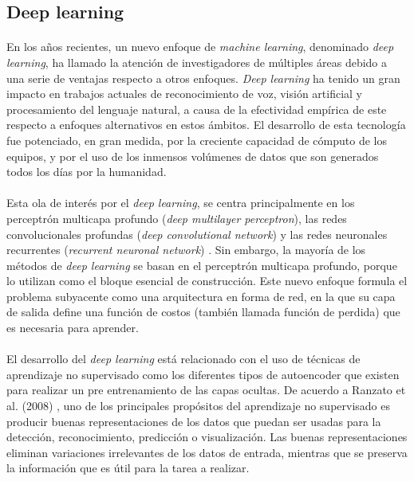 \documentclass[a4paper,12pt]{article}
\begin{document}
\subsection{Deep learning}
\paragraph{}
En los años recientes, un nuevo enfoque de \textit{machine learning}, denominado \textit{deep learning}, ha llamado la atención de investigadores de múltiples áreas debido a una serie de ventajas respecto a otros enfoques. \textit{Deep learning} ha tenido un gran impacto en trabajos actuales de reconocimiento de voz, visión artificial y procesamiento del lenguaje natural, a causa de la efectividad empírica de este respecto a enfoques alternativos en estos ámbitos. El desarrollo de esta tecnología fue potenciado, en gran medida, por la creciente capacidad de cómputo de los equipos, y por el uso de los inmensos volúmenes de datos que son generados todos los días por la humanidad.

\paragraph{}
Esta ola de interés por el \textit{deep learning}, se centra principalmente en los perceptrón multicapa profundo (\textit{deep multilayer perceptron}), las redes convolucionales profundas (\textit{deep convolutional network}) y las redes neuronales recurrentes (\textit{recurrent neuronal network}) \cite{mining}. Sin embargo, la mayoría de los métodos de \textit{deep learning} se basan en el perceptrón multicapa profundo, porque lo utilizan como el bloque esencial de construcción. Este nuevo enfoque formula el problema subyacente como una arquitectura en forma de red, en la que su capa de salida define una función de costos (también llamada función de perdida) que es necesaria para aprender.

\paragraph{}
El desarrollo del \textit{deep learning} está relacionado con el uso de técnicas de aprendizaje no supervisado como los diferentes tipos de autoencoder que existen para realizar un pre entrenamiento de las capas ocultas. De acuerdo a Ranzato et al. (2008) \cite{ranzato}, uno de los principales propósitos del aprendizaje no supervisado es producir buenas representaciones de los datos que puedan ser usadas para la detección, reconocimiento, predicción o visualización. Las buenas representaciones eliminan variaciones irrelevantes de los datos de entrada, mientras que se preserva la información que es útil para la tarea a realizar.
\end{document}
